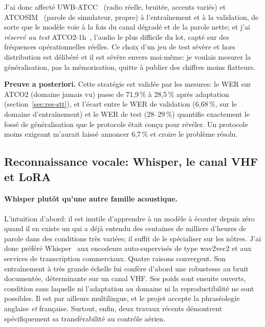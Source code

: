 \documentclass[11pt,a4paper]{article}
\begin{document}
J'ai donc affecté UWB-ATCC~\cite{uwbatcc} (radio réelle, bruitée, accents variés) et ATCOSIM~\cite{atcosim} (parole de simulateur, propre) à l'entraînement et à la validation, de sorte que le modèle voie à la fois du canal dégradé et de la parole nette; et j'ai \emph{réservé au test} ATCO2-1h~\cite{atco2}, l'audio le plus difficile du lot, capté sur des fréquences opérationnelles réelles. Ce choix d'un jeu de test sévère et hors distribution est délibéré et il est sévère envers moi-même: je voulais mesurer la généralisation, pas la mémorisation, quitte à publier des chiffres moins flatteurs.

\noindent\textbf{Preuve a posteriori.} Cette stratégie est validée par les mesures: le WER
sur ATCO2 (domaine jamais vu) passe de 71,9\,\% à 28,5\,\% après adaptation
(section~\ref{sec:res-stt}), et l'écart entre le WER de validation (6,68\,\%, sur le domaine
d'entraînement) et le WER de test (28--29\,\%) quantifie exactement le fossé de
généralisation que le protocole était conçu pour révéler. Un protocole moins exigeant
m'aurait laissé annoncer 6,7\,\% et croire le problème résolu.

\subsection{Reconnaissance vocale: Whisper, le canal VHF et LoRA}
\label{sec:whisper-lora}

\paragraph{Whisper plutôt qu'une autre famille acoustique.} L'intuition d'abord: il est inutile d'apprendre à un modèle à écouter depuis zéro quand il en existe un qui a déjà entendu des centaines de milliers d'heures de parole dans des conditions très variées; il suffit de le spécialiser sur les nôtres. J'ai donc préféré Whisper~\cite{whisper} aux encodeurs auto-supervisés de type wav2vec2 et aux services de transcription commerciaux. Quatre raisons convergent. Son entraînement à très grande échelle lui confère d'abord une robustesse au bruit documentée, déterminante sur un canal VHF. Ses poids sont ensuite ouverts, condition sans laquelle ni l'adaptation au domaine ni la reproductibilité ne sont possibles. Il est par ailleurs multilingue, et le projet accepte la phraséologie anglaise \emph{et} française. Surtout, enfin, deux travaux récents démontrent spécifiquement sa transférabilité au contrôle aérien.
\end{document}
